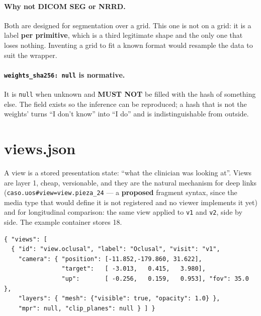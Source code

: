 \documentclass[11pt,a4paper]{article}
\newcommand{\MUSTNOT}{\textcolor{uosred}{\textbf{MUST NOT}}}
\newcommand{\code}[1]{\texttt{\small #1}}
\begin{document}
\paragraph{Why not DICOM SEG or NRRD.} Both are designed for segmentation over a grid. This
one is not on a grid: it is a label \textbf{per primitive}, which is a third legitimate
shape and the only one that loses nothing. Inventing a grid to fit a known format would
resample the data to suit the wrapper.

\paragraph{\code{weights\_sha256: null} is normative.} It is \code{null} when unknown and
\MUSTNOT{} be filled with the hash of something else. The field exists so the inference can
be reproduced; a hash that is not the weights' turns ``I don't know'' into ``I do'' and is
indistinguishable from outside.

\section{views.json}\label{sec:views}

A view is a stored presentation state: ``what the clinician was looking at''. Views are
layer 1, cheap, versionable, and they are the natural mechanism for deep links
(\code{caso.uos\#view=view.pieza\_24} --- a \textbf{proposed} fragment syntax, since the
media type that would define it is not registered and no viewer implements it yet) and for
longitudinal comparison: the same view applied to \code{v1} and \code{v2}, side by side.
The example container stores 18.

\begin{lstlisting}[style=js]
{ "views": [
  { "id": "view.oclusal", "label": "Oclusal", "visit": "v1",
    "camera": { "position": [-11.852,-179.860, 31.622],
                "target":   [ -3.013,   0.415,   3.980],
                "up":       [ -0.256,   0.159,   0.953], "fov": 35.0 },
    "layers": { "mesh": {"visible": true, "opacity": 1.0} },
    "mpr": null, "clip_planes": null } ] }
\end{lstlisting}
\end{document}
